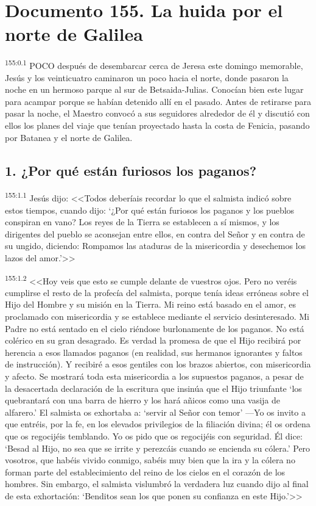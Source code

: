 \chapter{Documento 155. La huida por el norte de Galilea}
\par 
\textsuperscript{155:0.1} POCO después de desembarcar cerca de Jeresa este domingo memorable, Jesús y los veinticuatro caminaron un poco hacia el norte, donde pasaron la noche en un hermoso parque al sur de Betsaida-Julias. Conocían bien este lugar para acampar porque se habían detenido allí en el pasado. Antes de retirarse para pasar la noche, el Maestro convocó a sus seguidores alrededor de él y discutió con ellos los planes del viaje que tenían proyectado hasta la costa de Fenicia, pasando por Batanea y el norte de Galilea.

\section*{1. ¿Por qué están furiosos los paganos?}
\par 
\textsuperscript{155:1.1} Jesús dijo: <<Todos deberíais recordar lo que el salmista indicó sobre estos tiempos, cuando dijo: `¿Por qué están furiosos los paganos y los pueblos conspiran en vano? Los reyes de la Tierra se establecen a sí mismos, y los dirigentes del pueblo se aconsejan entre ellos, en contra del Señor y en contra de su ungido, diciendo: Rompamos las ataduras de la misericordia y desechemos los lazos del amor.'>>

\par 
\textsuperscript{155:1.2} <<Hoy veis que esto se cumple delante de vuestros ojos. Pero no veréis cumplirse el resto de la profecía del salmista, porque tenía ideas erróneas sobre el Hijo del Hombre y su misión en la Tierra. Mi reino está basado en el amor, es proclamado con misericordia y se establece mediante el servicio desinteresado. Mi Padre no está sentado en el cielo riéndose burlonamente de los paganos. No está colérico en su gran desagrado. Es verdad la promesa de que el Hijo recibirá por herencia a esos llamados paganos (en realidad, sus hermanos ignorantes y faltos de instrucción). Y recibiré a esos gentiles con los brazos abiertos, con misericordia y afecto. Se mostrará toda esta misericordia a los supuestos paganos, a pesar de la desacertada declaración de la escritura que insinúa que el Hijo triunfante `los quebrantará con una barra de hierro y los hará añicos como una vasija de alfarero.' El salmista os exhortaba a: `servir al Señor con temor' ---Yo os invito a que entréis, por la fe, en los elevados privilegios de la filiación divina; él os ordena que os regocijéis temblando. Yo os pido que os regocijéis con seguridad. Él dice: `Besad al Hijo, no sea que se irrite y perezcáis cuando se encienda su cólera.' Pero vosotros, que habéis vivido conmigo, sabéis muy bien que la ira y la cólera no forman parte del establecimiento del reino de los cielos en el corazón de los hombres. Sin embargo, el salmista vislumbró la verdadera luz cuando dijo al final de esta exhortación: `Benditos sean los que ponen su confianza en este Hijo.'>>

